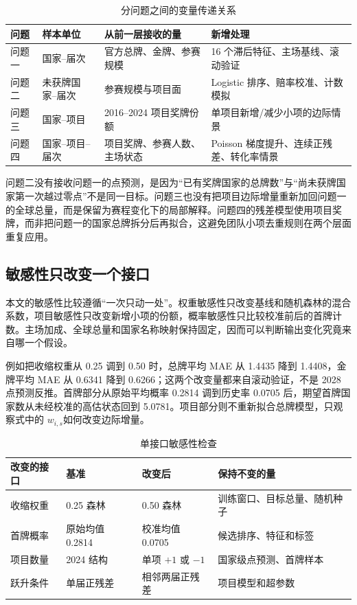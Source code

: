 \documentclass[UTF8,11pt,a4paper]{ctexart}
\begin{document}
\begin{table}[H]
\centering
\caption{分问题之间的变量传递关系}
\label{tab:question-interface}
\small
\begin{tabularx}{\textwidth}{p{2.4cm}p{4.2cm}p{4.5cm}X}
\toprule
问题 & 样本单位 & 从前一层接收的量 & 新增处理\\
\midrule
问题一 & 国家--届次 & 官方总牌、金牌、参赛规模 & 16 个滞后特征、主场基线、滚动验证\\
问题二 & 未获牌国家--届次 & 参赛规模与项目面 & Logistic 排序、赔率校准、计数模拟\\
问题三 & 国家--项目 & 2016--2024 项目奖牌份额 & 单项目新增/减少小项的边际情景\\
问题四 & 国家--项目--届次 & 项目奖牌、参赛人数、主场状态 & Poisson 梯度提升、连续正残差、转化率情景\\
\bottomrule
\end{tabularx}
\end{table}

问题二没有接收问题一的点预测，是因为“已有奖牌国家的总牌数”与“尚未获牌国家第一次越过零点”不是同一目标。问题三也没有把项目边际增量重新加回问题一的全球总量，而是保留为赛程变化下的局部解释。问题四的残差模型使用项目奖牌，而非把问题一的国家总牌拆分后再拟合，这避免团队小项去重规则在两个层面重复应用。

\subsection{敏感性只改变一个接口}

本文的敏感性比较遵循“一次只动一处”。权重敏感性只改变基线和随机森林的混合系数，项目敏感性只改变新增小项的份额，概率敏感性只比较校准前后的首牌计数。主场加成、全球总量和国家名称映射保持固定，因而可以判断输出变化究竟来自哪一个假设。

例如把收缩权重从 0.25 调到 0.50 时，总牌平均 MAE 从 1.4435 降到 1.4408，金牌平均 MAE 从 0.6341 降到 0.6266；这两个改变量都来自滚动验证，不是 2028 点预测反推。首牌部分从原始平均概率 0.2814 调到历史率 0.0705 后，期望首牌国家数从未经校准的高估状态回到 5.0781。项目部分则不重新拟合总牌模型，只观察式中的 $w_{i,s}$如何改变边际增量。

\begin{table}[H]
\centering
\caption{单接口敏感性检查}
\label{tab:sensitivity-single}
\small
\begin{tabularx}{\textwidth}{p{3.5cm}p{3.1cm}p{3.1cm}X}
\toprule
改变的接口 & 基准 & 改变后 & 保持不变的量\\
\midrule
收缩权重 & 0.25 森林 & 0.50 森林 & 训练窗口、目标总量、随机种子\\
首牌概率 & 原始均值 0.2814 & 校准均值 0.0705 & 候选排序、特征和标签\\
项目数量 & 2024 结构 & 单项 $+1$ 或 $-1$ & 国家级点预测、首牌样本\\
跃升条件 & 单届正残差 & 相邻两届正残差 & 项目模型和超参数\\
\bottomrule
\end{tabularx}
\end{table}
\end{document}
